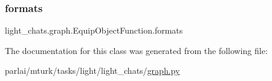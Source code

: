 \mbox{\label{classlight__chats_1_1graph_1_1EquipObjectFunction_a798cbf33f30601ca3ac770b472ddbe6c}} 
\subsubsection{\texorpdfstring{formats}{formats}}
{\footnotesize\ttfamily light\+\_\+chats.\+graph.\+Equip\+Object\+Function.\+formats}



The documentation for this class was generated from the following file\+:\begin{DoxyCompactItemize}
\item 
parlai/mturk/tasks/light/light\+\_\+chats/\hyperlink{parlai_2mturk_2tasks_2light_2light__chats_2graph_8py}{graph.\+py}\end{DoxyCompactItemize}
